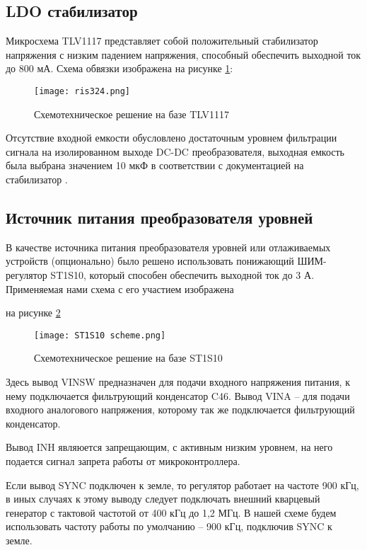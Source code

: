 \subsection{LDO стабилизатор}
\hspace{1cm}

Микросхема TLV1117 представляет собой положительный стабилизатор напряжения с низким падением напряжения, 
способный обеспечить выходной ток до 800 мА. Схема обвязки изображена на рисунке \ref{ris:324}: 

\begin{figure}[H]
    \centering
    \texttt{[image: ris324.png]}
    \caption{Схемотехническое решение на базе TLV1117}
    \label{ris:324}
\end{figure}

Отсутствие входной емкости обусловлено достаточным уровнем фильтрации сигнала на изолированном выходе 
DC-DC преобразователя, выходная емкость была выбрана значением 10 мкФ в соответствии с документацией 
на стабилизатор \cite{TLV1117:datasheet}. 

\subsection{Источник питания преобразователя уровней}
\hspace{1cm}

В качестве источника питания преобразователя уровней или отлаживаемых устройств (опционально) было решено 
использовать понижающий ШИМ-регулятор ST1S10, который способен обеспечить выходной ток до 3 А. 
Применяемая нами схема с его участием изображена 

на рисунке \ref{ris:ST1S10}

\begin{figure}[H]
    \centering
    \texttt{[image: ST1S10 scheme.png]}
    \caption{Схемотехническое решение на базе ST1S10}
    \label{ris:ST1S10}
\end{figure}

Здесь вывод VINSW предназначен для подачи входного напряжения питания, к нему подключается фильтрующий 
конденсатор C46. Вывод VINA -- для подачи входного аналогового напряжения, которому так же подключается 
фильтрующий конденсатор. 

Вывод INH являюется запрещающим, с активным низким уровнем, на него подается сигнал запрета работы от 
микроконтроллера. 

Если вывод SYNC подключен к земле, то регулятор работает на частоте 900 кГц, в иных случаях к этому выводу 
следует подключать внешний кварцевый генератор с тактовой частотой от 400 кГц до 1,2 МГц. В нашей схеме 
будем использовать частоту работы по умолчанию -- 900 кГц, подключив SYNC к земле. 

